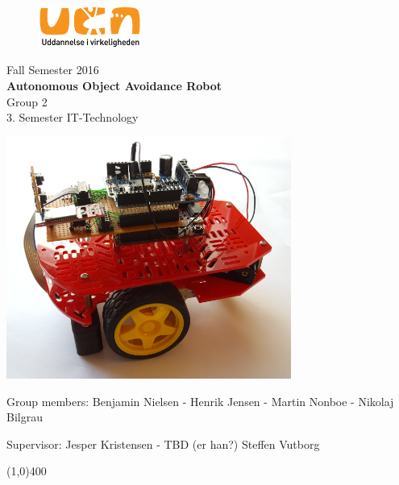 \clearpage
\thispagestyle{empty}

\begin{figure}[H]
	\raggedleft
		\includegraphics[width=0.3\textwidth]{figures/logo-ucn.png}
\end{figure}
\vspace*{\fill} 
\begin{center}
\begin{Huge}
Fall Semester 2016\\
\vspace{5 mm}
\textbf{Autonomous Object Avoidance Robot}\\
\vspace{3 mm}
Group 2\\
\vspace{3 mm}
3. Semester IT-Technology
\end{Huge}
\includegraphics[width=0.7\textwidth]{figures/Forsidebil.PNG}
\end{center}
\vspace*{\fill}
\begin{center}
Group members:
 Benjamin Nielsen - Henrik Jensen - Martin Nonboe - Nikolaj Bilgrau
\end{center}
\begin{center}
Supervisor: Jesper Kristensen - TBD (er han?) Steffen Vutborg
\end{center}
\begin{center}
\line(1,0){400}
\end{center}
